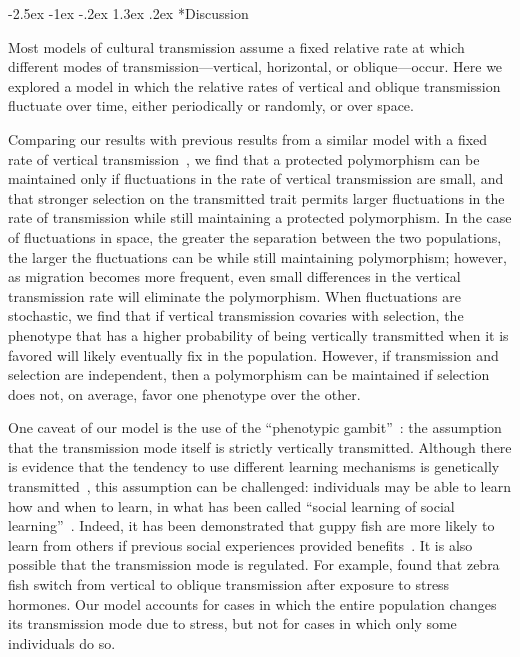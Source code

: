 \documentclass[14pt]{extarticle}
\makeatletter
\renewcommand\section{\@startsection {section}{1}{\z@}%
     {-2.5ex \@plus -1ex \@minus -.2ex}%
     {1.3ex \@plus.2ex}%
    {\Large\bfseries}}
\makeatother
\begin{document}
\section*{Discussion}

Most models of cultural transmission assume a fixed relative rate at which different modes of transmission---vertical, horizontal, or oblique---occur.
Here we explored a model in which the relative rates of vertical and oblique transmission fluctuate over time, either periodically or randomly, or over space.

Comparing our results with previous results from a similar model with a fixed rate of vertical transmission~\citep{Ram2018}, we find that a protected polymorphism can be maintained only if fluctuations in the rate of vertical transmission are small, and that stronger selection on the transmitted trait permits larger fluctuations in the rate of transmission while still maintaining a protected polymorphism. 
In the case of fluctuations in space, the greater the separation between the two populations, the larger the fluctuations can be while still maintaining polymorphism; however, as migration becomes more frequent, even small differences in the vertical transmission rate will eliminate the polymorphism.
When fluctuations are stochastic, we find that if vertical transmission covaries with selection, the phenotype that has a higher probability of being vertically transmitted  when it is favored will likely eventually fix in the population.
However, if transmission and selection are independent, then a polymorphism can be maintained if selection does not, on average, favor one phenotype over the other.

One caveat of our model is the use of the ``phenotypic gambit''~\citep{Grafen1984}: the assumption that the transmission mode itself is strictly vertically transmitted.
Although there is evidence that the tendency to use different learning mechanisms is genetically transmitted~\citep{Foucaud2013}, this assumption can be challenged: individuals may be able to learn how and when to learn, in what has been called ``social learning of social learning''~\citep{Mesoudi2016}.
Indeed, it has been demonstrated that guppy fish are more likely to learn from others if previous social experiences provided benefits~\citep{Leris2016}.
It is also possible that the transmission mode is regulated.
For example, \citet{Farine2015} found that zebra fish switch from vertical to oblique transmission after exposure to stress hormones.
Our model accounts for cases in which the entire population changes its transmission mode due to stress, but not for cases in which only some individuals do so.
\end{document}
